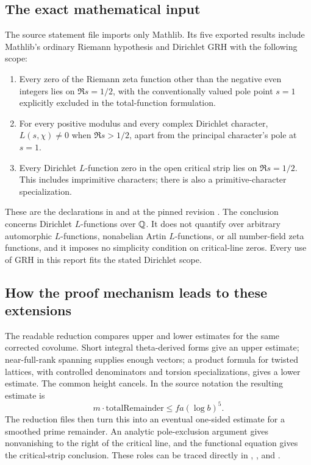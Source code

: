 \subsection{The exact mathematical input}

The source statement file imports only Mathlib. Its five exported results
include Mathlib's ordinary Riemann hypothesis and Dirichlet GRH with the
following scope:
\begin{enumerate}
\item Every zero of the Riemann zeta function other than the negative even
integers lies on $\Re s=1/2$, with the conventionally valued pole point
$s=1$ explicitly excluded in the total-function formulation.
\item For every positive modulus and every complex Dirichlet character,
$L(s,\chi)\ne0$ when $\Re s>1/2$, apart from the principal character's
pole at $s=1$.
\item Every Dirichlet $L$-function zero in the open critical strip lies on
$\Re s=1/2$. This includes imprimitive characters; there is also a
primitive-character specialization.
\end{enumerate}
These are the declarations in  and 
at the pinned revision \cite{sernau}. The conclusion concerns Dirichlet
$L$-functions over $\mathbb Q$. It does not quantify over arbitrary automorphic
$L$-functions, nonabelian Artin $L$-functions, or all number-field zeta
functions, and it imposes no simplicity condition on critical-line zeros.
Every use of GRH in this report fits the stated Dirichlet scope.

\subsection{How the proof mechanism leads to these extensions}

The readable reduction compares upper and lower estimates for the same
corrected covolume. Short integral theta-derived forms give an upper
estimate; near-full-rank spanning supplies enough vectors; a product formula
for twisted lattices, with controlled denominators and torsion
specializations, gives a lower estimate. The common height cancels. In the
source notation the resulting estimate is
\[
 m\cdot\mathrm{totalRemainder}\le f a(\log b)^5.
\]
The reduction files then turn this into an eventual one-sided estimate for
a smoothed prime remainder. An analytic pole-exclusion argument gives
nonvanishing to the right of the critical line, and the functional equation
gives the critical-strip conclusion. These roles can be traced directly in
,
, and 
\cite{sernau}.

